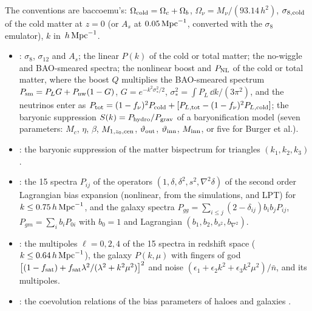 The conventions are baccoemu's: $\Omega_{\rm cold}=\Omega_c+\Omega_b$, $\Omega_\nu=M_\nu/(93.14\,h^2)$, $\sigma_{8,\rm cold}$ of
the cold matter at $z=0$ (or $A_s$ at $0.05\,{\rm Mpc}^{-1}$, converted with the $\sigma_8$ emulator), $k$ in $\,h\,\mathrm{Mpc}^{-1}$.
\begin{itemize}
\item {}: $\sigma_8$, $\sigma_{12}$ and $A_s$; the linear $P(k)$ of the cold or total matter; the
      no-wiggle and BAO-smeared spectra; the nonlinear boost and $P_{\rm NL}$ of the cold or total matter, where the boost
      $Q$ multiplies the BAO-smeared spectrum
      $P_{\rm sm}=P_LG+P_{\rm nw}(1-G)$, $G=e^{-k^2\sigma_\ast^2/2}$, $\sigma_\ast^2=\int P_L\,\dd k/(3\pi^2)$, and the
      neutrinos enter as $P_{\rm tot}=(1-f_\nu)^2P_{\rm cold}+[P_{L,\rm tot}-(1-f_\nu)^2P_{L,\rm cold}]$; the baryonic
      suppression $S(k)=P_{\rm hydro}/P_{\rm grav}$ of a baryonification model (seven parameters: $M_c$, $\eta$, $\beta$,
      $M_{1,z_0,\rm cen}$, $\vartheta_{\rm out}$, $\vartheta_{\rm inn}$, $M_{\rm inn}$, or five for Burger et al.).
\item {}: the baryonic suppression of the matter bispectrum for triangles $(k_1,k_2,k_3)$.
\item {}: the 15 spectra $P_{ij}$ of the operators $(1,\delta,\delta^2,s^2,\nabla^2\delta)$ of the
      second order Lagrangian bias expansion (nonlinear, from the simulations, and LPT) for $k\le0.75\,h\,\mathrm{Mpc}^{-1}$, and the galaxy
      spectra $P_{gg}=\sum_{i\le j}(2-\delta_{ij})b_ib_jP_{ij}$, $P_{gm}=\sum_ib_iP_{0i}$ with $b_0=1$ and Lagrangian
      $(b_1,b_2,b_{s^2},b_{\nabla^2})$.
\item {}: the multipoles $\ell=0,2,4$ of the 15 spectra in redshift space ($k\le0.64\,h\,\mathrm{Mpc}^{-1}$), the galaxy
      $P(k,\mu)$ with fingers of god $\big[(1-f_{\rm sat})+f_{\rm sat}\lambda^2/(\lambda^2+k^2\mu^2)\big]^2$ and noise
      $(\epsilon_1+\epsilon_2k^2+\epsilon_3k^2\mu^2)/\bar n$, and its multipoles.
\item {}: the coevolution relations of the bias parameters of haloes and galaxies \cite{Zennaro2022}.
\end{itemize}

